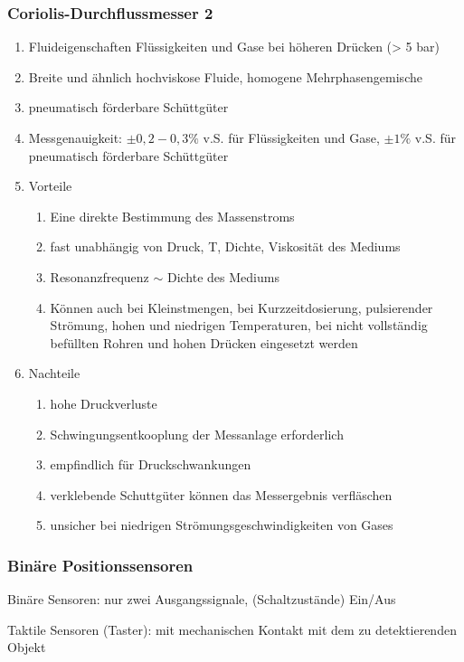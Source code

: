 \documentclass[a4paper]{scrartcl}
\begin{document}
\subsubsection{Coriolis-Durchflussmesser 2}
\begin{enumerate}
\item Fluideigenschaften Flüssigkeiten und Gase bei höheren Drücken (> 5 bar)
\item Breite und ähnlich hochviskose Fluide, homogene Mehrphasengemische
\item pneumatisch förderbare Schüttgüter
\item Messgenauigkeit: $\pm 0,2 - 0,3 \%$ v.S. für Flüssigkeiten und Gase, $\pm 1 \%$ v.S. für pneumatisch förderbare Schüttgüter
\item Vorteile
    \begin{enumerate}
    \item Eine direkte Bestimmung des Massenstroms
    \item fast unabhängig von Druck, T, Dichte, Viskosität des Mediums
    \item Resonanzfrequenz $\sim$ Dichte des Mediums
    \item Können auch bei Kleinstmengen, bei Kurzzeitdosierung, pulsierender Strömung, hohen und niedrigen Temperaturen, bei nicht vollständig befüllten Rohren und hohen Drücken eingesetzt werden
    \end{enumerate}
\item Nachteile
    \begin{enumerate}
    \item hohe Druckverluste
    \item Schwingungsentkooplung der Messanlage erforderlich
    \item empfindlich für Druckschwankungen
    \item verklebende Schuttgüter können das Messergebnis verfläschen
    \item unsicher bei niedrigen Strömungsgeschwindigkeiten von Gases
    \end{enumerate}
\end{enumerate}

\subsubsection{Binäre Positionssensoren}
Binäre Sensoren: nur zwei Ausgangssignale, (Schaltzustände) Ein/Aus

Taktile Sensoren (Taster): mit mechanischen Kontakt mit dem zu detektierenden Objekt
\end{document}
